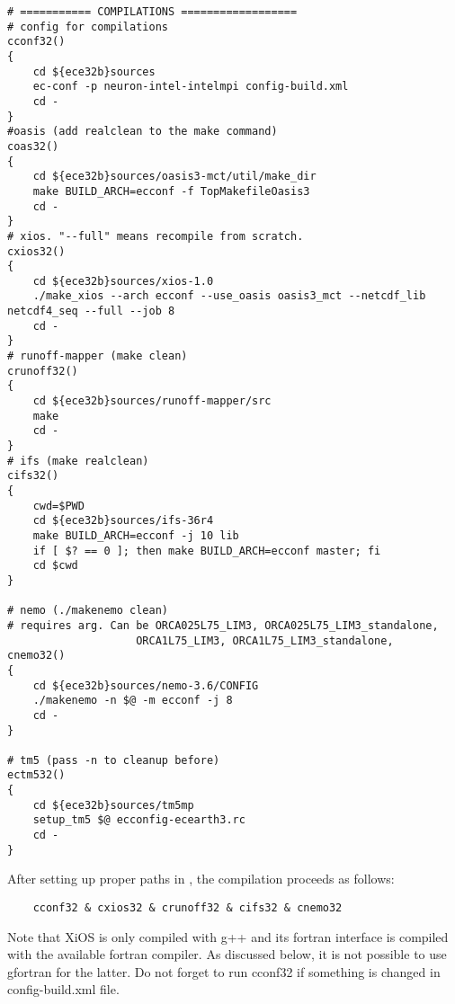 \begin{lstlisting}
# =========== COMPILATIONS ==================
# config for compilations
cconf32()
{
    cd ${ece32b}sources
    ec-conf -p neuron-intel-intelmpi config-build.xml
    cd -
}
#oasis (add realclean to the make command)
coas32()
{
    cd ${ece32b}sources/oasis3-mct/util/make_dir
    make BUILD_ARCH=ecconf -f TopMakefileOasis3
    cd -
}
# xios. "--full" means recompile from scratch.
cxios32()
{
    cd ${ece32b}sources/xios-1.0
    ./make_xios --arch ecconf --use_oasis oasis3_mct --netcdf_lib netcdf4_seq --full --job 8
    cd -
}
# runoff-mapper (make clean)
crunoff32()
{
    cd ${ece32b}sources/runoff-mapper/src
    make
    cd -
}
# ifs (make realclean)
cifs32()
{
    cwd=$PWD 
    cd ${ece32b}sources/ifs-36r4
    make BUILD_ARCH=ecconf -j 10 lib
    if [ $? == 0 ]; then make BUILD_ARCH=ecconf master; fi
    cd $cwd
}

# nemo (./makenemo clean)
# requires arg. Can be ORCA025L75_LIM3, ORCA025L75_LIM3_standalone, 
                    ORCA1L75_LIM3, ORCA1L75_LIM3_standalone,
cnemo32()
{
    cd ${ece32b}sources/nemo-3.6/CONFIG
    ./makenemo -n $@ -m ecconf -j 8
    cd -
} 

# tm5 (pass -n to cleanup before)
ectm532()
{
    cd ${ece32b}sources/tm5mp
    setup_tm5 $@ ecconfig-ecearth3.rc
    cd -
}
\end{lstlisting}

After setting up proper paths in , the compilation proceeds as follows:
\begin{verbatim}
    cconf32 & cxios32 & crunoff32 & cifs32 & cnemo32  
\end{verbatim}
Note that XiOS is only compiled with g++ and its fortran interface is compiled with the available fortran compiler. As discussed below, it is not possible to use gfortran for the latter. Do not forget to run cconf32 if something is changed in config-build.xml file.

